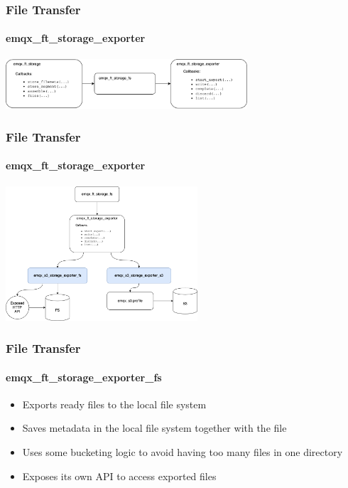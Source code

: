 \documentclass{beamer}
\begin{document}
\begin{frame}
    \frametitle{File Transfer}
    \framesubtitle{emqx\_ft\_storage\_exporter}

    \begin{center}
        \includegraphics[width=9cm, keepaspectratio]{images/ft_storage_fs.png}
    \end{center}
\end{frame}


\begin{frame}
    \frametitle{File Transfer}
    \framesubtitle{emqx\_ft\_storage\_exporter}

    \begin{center}
        \includegraphics[height=5cm, keepaspectratio]{images/ft_storage_fs_exports.png}
    \end{center}
\end{frame}

\begin{frame}
    \frametitle{File Transfer}
    \framesubtitle{emqx\_ft\_storage\_exporter\_fs}
    \begin{itemize}
        \item Exports ready files to the local file system
        \item Saves metadata in the local file system together with the file
        \item Uses some bucketing logic to avoid having too many files in one directory
        \item Exposes its own API to access exported files
    \end{itemize}
    \begin{center}
    \end{center}
\end{frame}
\end{document}
